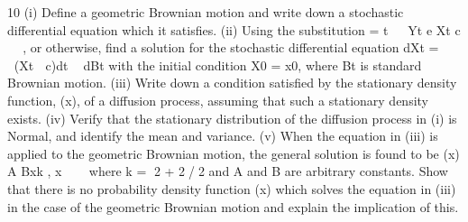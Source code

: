 \documentclass[a4paper,12pt]{article}
\begin{document}
\begin{enumerate}
10 (i) Define a geometric Brownian motion and write down a stochastic differential
equation which it satisfies. 
(ii) Using the substitution = t  
Yt e Xt c 
 , or otherwise, find a solution for the
stochastic differential equation
dXt = (Xt  c)dt  dBt
with the initial condition X0 = x0, where Bt is standard Brownian motion. 
(iii) Write down a condition satisfied by the stationary density function, 
(x), of a
diffusion process, assuming that such a stationary density exists. 
(iv) Verify that the stationary distribution of the diffusion process in (i) is Normal,
and identify the mean and variance. 
(v) When the equation in (iii) is applied to the geometric Brownian motion, the
general solution is found to be
(x) A Bxk ,
x   
where k = 2 + 2/2 and A and B are arbitrary constants. Show that there is
no probability density function 
(x) which solves the equation in (iii) in the
case of the geometric Brownian motion and explain the implication of this. 
\end{enumerate}
\end{document}
